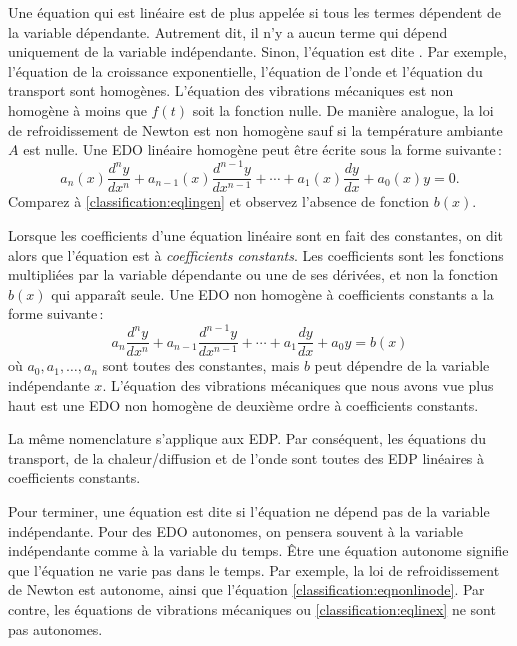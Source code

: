 \medskip

Une \'equation qui est lin\'eaire est de plus appel\'ee \emph{} si tous les termes d\'ependent de la variable d\'ependante.  Autrement dit, il n'y a aucun terme qui d\'epend uniquement de la variable ind\'ependante.  Sinon, l'\'equation est dite \emph{}.  Par exemple, l'\'equation de la croissance exponentielle, l'\'equation de l'onde et l'\'equation du transport sont homog\`enes.  L'\'equation des vibrations m\'ecaniques est non homog\`ene \`a moins que $f(t)$ soit la fonction nulle.  De mani\`ere analogue, la loi de refroidissement de Newton est non homog\`ene sauf si la temp\'erature ambiante $A$ est nulle.
Une EDO lin\'eaire homog\`ene peut \^etre \'ecrite sous la forme suivante\,: 
\begin{equation*}
a_n(x) \frac{d^n y}{dx^n} + 
a_{n-1}(x) \frac{d^{n-1} y}{dx^{n-1}} + 
\cdots
+
a_{1}(x) \frac{dy}{dx}
+
a_{0}(x) y = 0 .
\end{equation*}
Comparez \`a \eqref{classification:eqlingen} et observez l'absence de fonction $b(x)$.

\medskip

Lorsque les coefficients d'une \'equation lin\'eaire sont en fait des constantes, on dit alors que l'\'equation est \`a 
\emph{coefficients constants}.
Les coefficients sont les fonctions multipli\'ees par la variable d\'ependante ou une de ses d\'eriv\'ees, et non la fonction $b(x)$ qui appara\^it seule.
Une EDO non homog\`ene \`a coefficients constants a la forme suivante\,: 
\begin{equation*}
a_n \frac{d^n y}{dx^n} + 
a_{n-1} \frac{d^{n-1} y}{dx^{n-1}} + 
\cdots
+
a_{1} \frac{dy}{dx}
+
a_{0} y = b(x) 
\end{equation*}
o\`u $a_0, a_1, \ldots, a_n$ sont toutes des constantes, mais 
$b$ peut d\'ependre de la variable ind\'ependante $x$.
L'\'equation des vibrations m\'ecaniques que nous avons vue plus haut est une EDO non homog\`ene de deuxi\`eme ordre \`a coefficients constants.  

La m\^eme nomenclature s'applique aux EDP.  Par cons\'equent, les \'equations du transport, de la chaleur/diffusion et de l'onde sont toutes des EDP lin\'eaires \`a coefficients constants.

\medskip

Pour terminer, une \'equation est dite \emph{}
 si l'\'equation ne d\'epend pas de la variable ind\'ependante.  Pour des EDO autonomes, on pensera souvent \`a la variable ind\'ependante comme \`a la variable du temps.  \^Etre une \'equation autonome signifie que l'\'equation ne varie pas dans le temps.  Par exemple, la loi de refroidissement de Newton est autonome, ainsi que l'\'equation \eqref{classification:eqnonlinode}.  Par contre, les \'equations de vibrations m\'ecaniques ou \eqref{classification:eqlinex} ne sont pas autonomes.

